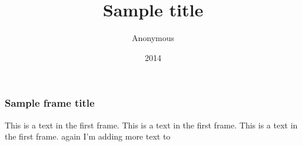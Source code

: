 \documentclass{beamer}
\title{Sample title}
\author{Anonymous}
\institute{Overleaf}
\date{2014}
\begin{document}
 
\frame{\titlepage}
 
\begin{frame}
\frametitle{Sample frame title}
This is a text in the first frame. This is a text in the first frame. This is a text in the first frame.
again I'm adding more text to
\end{frame}
 
\end{document}
